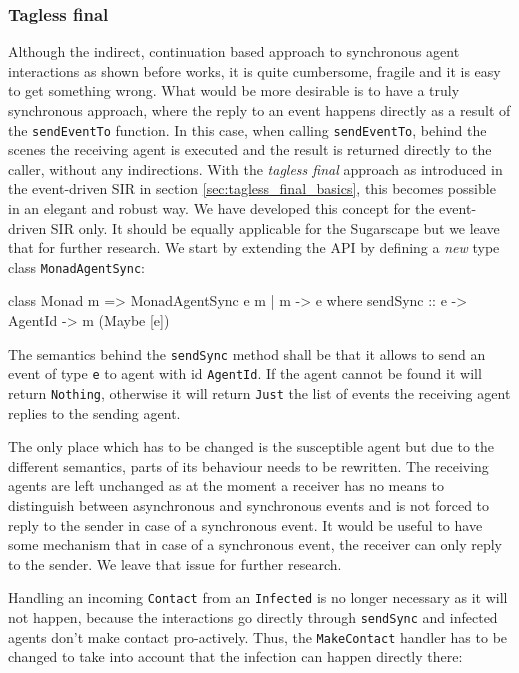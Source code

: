 \subsubsection{Tagless final}
Although the indirect, continuation based approach to synchronous agent interactions as shown before works, it is quite cumbersome, fragile and it is easy to get something wrong. What would be more desirable is to have a truly synchronous approach, where the reply to an event happens directly as a result of the \texttt{sendEventTo} function. In this case, when calling \texttt{sendEventTo}, behind the scenes the receiving agent is executed and the result is returned directly to the caller, without any indirections. With the \textit{tagless final} approach as introduced in the event-driven SIR in section \ref{sec:tagless_final_basics}, this becomes possible in an elegant and robust way. We have developed this concept for the event-driven SIR only. It should be equally applicable for the Sugarscape but we leave that for further research. We start by extending the API by defining a \textit{new} type class \texttt{MonadAgentSync}:

\begin{HaskellCode}
class Monad m => MonadAgentSync e m | m -> e where
  sendSync :: e -> AgentId -> m (Maybe [e])
\end{HaskellCode}

The semantics behind the \texttt{sendSync} method shall be that it allows to send an event of type \texttt{e} to agent with id \texttt{AgentId}. If the agent cannot be found it will return \texttt{Nothing}, otherwise it will return \texttt{Just} the list of events the receiving agent replies to the sending agent. 

The only place which has to be changed is the susceptible agent but due to the different semantics, parts of its behaviour needs to be rewritten. The receiving agents are left unchanged as at the moment a receiver has no means to distinguish between asynchronous and synchronous events and is not forced to reply to the sender in case of a synchronous event. It would be useful to have some mechanism that in case of a synchronous event, the receiver can only reply to the sender. We leave that issue for further research.

Handling an incoming \texttt{Contact} from an \texttt{Infected} is no longer necessary as it will not happen, because the interactions go directly through \texttt{sendSync} and infected agents don't make contact pro-actively. Thus, the \texttt{MakeContact} handler has to be changed to take into account that the infection can happen directly there:

